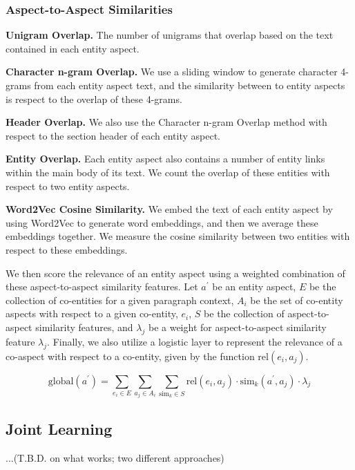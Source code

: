 \subsubsection{Aspect-to-Aspect Similarities}


\textbf{Unigram Overlap.} The number of unigrams that overlap based on the text contained in each entity aspect.


\textbf{Character n-gram Overlap.} We use a sliding window to generate character 4-grams from each entity aspect text, and the similarity between to entity aspects is respect to the overlap of these 4-grams.

\textbf{Header Overlap.}
We also use the Character n-gram Overlap method with respect to the section header of each entity aspect.

\textbf{Entity Overlap.}
Each entity aspect also contains a number of entity links within the main body of its text. We count the overlap of these entities with respect to two entity aspects.

\textbf{Word2Vec Cosine Similarity.} 
We embed the text of each entity aspect by using Word2Vec to generate word embeddings, and then we average these embeddings together. We measure the cosine similarity between two entities with respect to these embeddings.

We then score the relevance of an entity aspect using a weighted combination of these aspect-to-aspect similarity features.  
Let $a^{'}$ be an entity aspect, $E$ be the collection of co-entities for a given paragraph context, $A_i$ be the set of co-entity aspects with respect to a given co-entity, $e_i$, $S$ be the collection of aspect-to-aspect similarity features, and $\lambda_j$ be a weight for aspect-to-aspect similarity feature $\lambda_j$. Finally, we also utilize a logistic layer to represent the relevance of a co-aspect with respect to a co-entity, given by the function $\text{rel}(e_i, a_j)$. 

\begin{equation}
\text{global}(a^{'}) = \sum_{e_i  \in E}\sum_{a_j \in A_i}\sum_{\text{sim}_k \in S} \text{rel}(e_i, a_j) \cdot \text{sim}_k(a^{'}, a_j) \cdot \lambda_j
\end{equation}

\subsection{Joint Learning}
...(T.B.D. on what works; two different approaches)




